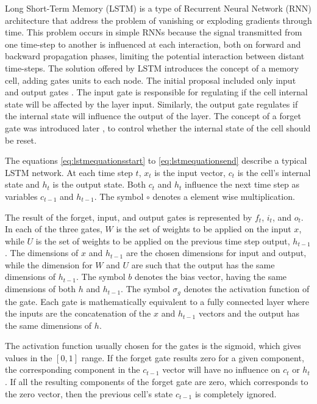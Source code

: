 Long Short-Term Memory\cite{hochreiter_long_1997} (LSTM) is a type of Recurrent Neural Network (RNN) architecture that address the problem of vanishing or exploding gradients through time. This problem occurs in simple RNNs because the signal transmitted from one time-step to another is influenced at each interaction, both on forward and backward propagation phases, limiting the potential interaction between distant time-steps. The solution offered by LSTM introduces the concept of a memory cell, adding gates units to each node. The initial proposal included only input and output gates \cite{hochreiter_long_1997}.
The input gate is responsible for regulating if the cell internal state will be affected by the layer input. Similarly, the output gate regulates if the internal state will influence the output of the layer. The concept of a forget gate was introduced later \cite{gers_learning_1999}, to control whether the internal state of the cell should be reset.

The equations \eqref{eq:lstmequationsstart} to \eqref{eq:lstmequationsend} describe a typical LSTM network. At each time step $t$, $x_t$ is the input vector, $c_t$ is the cell's internal state and $h_t$ is the output state. Both $c_t$ and $h_t$ influence the next time step as variables $c_{t-1}$ and $h_{t-1}$. The symbol $\circ$ denotes a element wise multiplication.


The result of the forget, input, and output gates is represented by $f_t$, $i_t$, and $o_t$.
In each of the three gates, $W$ is the set of weights to be applied on the input $x$, while $U$ is the set of weights to be applied on the previous time step output, $h_{t-1}$. The dimensions of $x$ and $h_{t-1}$ are the chosen dimensions for input and output, while the dimension for $W$ and $U$ are such that the output has the same dimensions of $h_{t-1}$.  The symbol $b$ denotes the bias vector, having the same dimensions of both $h$ and $h_{t-1}$. The symbol $\sigma_g$ denotes the activation function of the gate. Each gate is mathematically equivalent to a fully connected layer where the inputs are the concatenation of the $x$ and $h_{t-1}$ vectors and the output has the same dimensions of $h$.

The activation function usually chosen for the gates is the sigmoid, which gives values in the $[0,1]$ range. If the forget gate results zero for a given component, the corresponding component in the $c_{t-1}$ vector will have no influence on $c_t$ or $h_t$. If all the resulting components of the forget gate are zero, which corresponds to the zero vector, then the previous cell's state $c_{t-1}$ is completely ignored.

